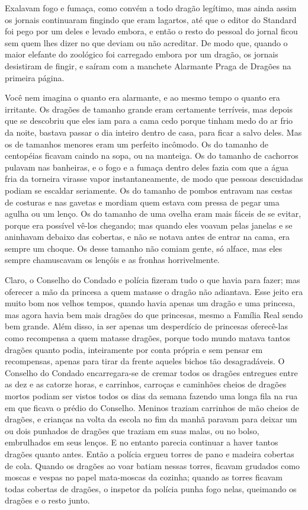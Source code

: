 Exalavam fogo e fumaça, como convém a todo dragão legítimo, mas ainda
assim os jornais continuaram fingindo que eram lagartos, até que o
editor do Standard foi pego por um deles e levado embora, e então o
resto do pessoal do jornal ficou sem quem lhes dizer no que deviam ou
não acreditar. De modo que, quando o maior elefante do zoológico foi
carregado embora por um dragão, os jornais desistiram de fingir, e
saíram com a manchete Alarmante Praga de Dragões na primeira página.

Você nem imagina o quanto era alarmante, e ao mesmo tempo o quanto era
irritante. Os dragões de tamanho grande eram certamente terríveis,
mas depois que se descobriu que eles iam para a cama cedo porque
tinham medo do ar frio da noite, bastava passar o dia inteiro dentro
de casa, para ficar a salvo deles. Mas os de tamanhos menores eram um
perfeito incômodo. Os do tamanho de centopéias ficavam caindo na
sopa, ou na manteiga. Os do tamanho de cachorros pulavam nas
banheiras, e o fogo e a fumaça dentro deles fazia com que a água fria
da torneira virasse vapor instantaneamente, de modo que pessoas
descuidadas podiam se escaldar seriamente. Os do tamanho de pombos
entravam nas cestas de costuras e nas gavetas e mordiam quem estava
com pressa de pegar uma agulha ou um lenço. Os do tamanho de uma
ovelha eram mais fáceis de se evitar, porque era possível vê-los
chegando; mas quando eles voavam pelas janelas e se aninhavam debaixo
das cobertas, e não se notava antes de entrar na cama, era sempre um
choque. Os desse tamanho não comiam gente, só alface, mas eles sempre
chamuscavam os lençóis e as fronhas horrivelmente. 

Claro, o Conselho do Condado e polícia fizeram tudo o que havia para
fazer; mas oferecer a mão da princesa a quem matasse o dragão não
adiantava. Esse jeito era muito bom nos velhos tempos, quando havia
apenas um dragão e uma princesa, mas agora havia bem mais dragões do
que princesas, mesmo a Família Real sendo bem grande. Além disso, ia
ser apenas um desperdício de princesas oferecê-las como recompensa a
quem matasse dragões, porque todo mundo matava tantos dragões quanto
podia, inteiramente por conta própria e sem pensar em recompensas,
apenas para tirar da frente aqueles bichos tão desagradáveis. O
Conselho do Condado encarregara-se de cremar todos os dragões
entregues entre as dez e as catorze horas, e carrinhos, carroças e
caminhões cheios de dragões mortos podiam ser vistos todos os dias da
semana fazendo uma longa fila na rua em que ficava o prédio do
Conselho. Meninos traziam carrinhos de mão cheios de dragões, e
crianças na volta da escola no fim da manhã paravam para deixar um ou
dois punhados de dragões que traziam em suas malas, ou no bolso,
embrulhados em seus lenços. E no entanto parecia continuar a haver
tantos dragões quanto antes. Então a polícia ergueu torres de pano e
madeira cobertas de cola. Quando os dragões ao voar batiam nessas
torres, ficavam grudados como moscas e vespas no papel mata-moscas da
cozinha; quando as torres ficavam todas cobertas de dragões, o
inspetor da polícia punha fogo nelas, queimando os dragões e o resto
junto.

